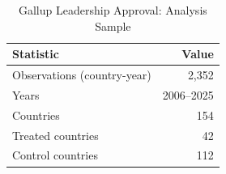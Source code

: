 \begin{table}
\caption{Gallup Leadership Approval: Analysis Sample}
\label{tab:summary_gallup}
\begin{tabular}{lr}
\toprule
Statistic & Value \\
\midrule
Observations (country-year) & 2,352 \\
Years & 2006–2025 \\
Countries & 154 \\
Treated countries & 42 \\
Control countries & 112 \\
\bottomrule
\end{tabular}
\end{table}
